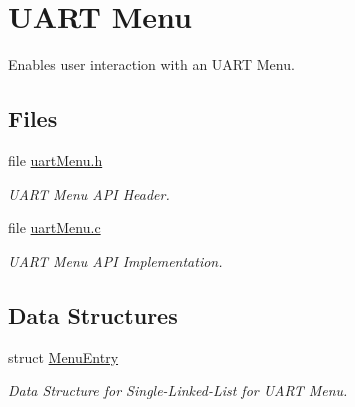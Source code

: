 \hypertarget{group__uartmenu}{\section{U\-A\-R\-T Menu}
\label{group__uartmenu}
}


Enables user interaction with an U\-A\-R\-T Menu.  


\subsection*{Files}
\begin{DoxyCompactItemize}
\item 
file \hyperlink{uart_menu_8h}{uart\-Menu.\-h}
\begin{DoxyCompactList}\small\item\em U\-A\-R\-T Menu A\-P\-I Header. \end{DoxyCompactList}\item 
file \hyperlink{uart_menu_8c}{uart\-Menu.\-c}
\begin{DoxyCompactList}\small\item\em U\-A\-R\-T Menu A\-P\-I Implementation. \end{DoxyCompactList}\end{DoxyCompactItemize}
\subsection*{Data Structures}
\begin{DoxyCompactItemize}
\item 
struct \hyperlink{struct_menu_entry}{Menu\-Entry}
\begin{DoxyCompactList}\small\item\em Data Structure for Single-\/\-Linked-\/\-List for U\-A\-R\-T Menu. \end{DoxyCompactList}\end{DoxyCompactItemize}
